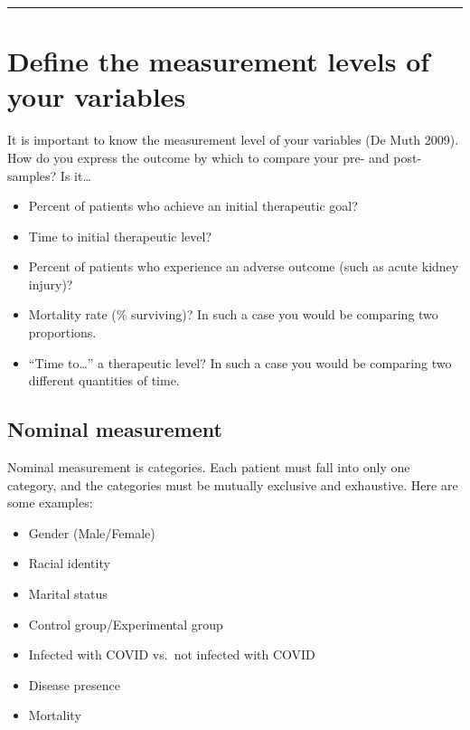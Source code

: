 \documentclass[
  letterpaper,
  DIV=11,
  numbers=noendperiod]{scrreprt}
\providecommand{\tightlist}{%
  \setlength{\itemsep}{0pt}\setlength{\parskip}{0pt}}\usepackage{longtable,booktabs,array}
\begin{document}
\begin{center}\rule{0.5\linewidth}{0.5pt}\end{center}

\hypertarget{define-the-measurement-levels-of-your-variables}{%
\section*{Define the measurement levels of your
variables}\label{define-the-measurement-levels-of-your-variables}}

It is important to know the measurement level of your variables (De Muth
2009). How do you express the outcome by which to compare your pre- and
post- samples? Is it\ldots{}

\begin{itemize}
\tightlist
\item
  Percent of patients who achieve an initial therapeutic goal?
\item
  Time to initial therapeutic level?
\item
  Percent of patients who experience an adverse outcome (such as acute
  kidney injury)?
\item
  Mortality rate (\% surviving)? In such a case you would be comparing
  two proportions.
\item
  ``Time to\ldots{}'' a therapeutic level? In such a case you would be
  comparing two different quantities of time.
\end{itemize}

\hypertarget{nominal-measurement}{%
\subsection*{Nominal measurement}\label{nominal-measurement}}

Nominal measurement is categories. Each patient must fall into only one
category, and the categories must be mutually exclusive and exhaustive.
Here are some examples:

\begin{itemize}
\tightlist
\item
  Gender (Male/Female)
\item
  Racial identity
\item
  Marital status
\item
  Control group/Experimental group
\item
  Infected with COVID vs.~not infected with COVID
\item
  Disease presence
\item
  Mortality
\end{itemize}
\end{document}
